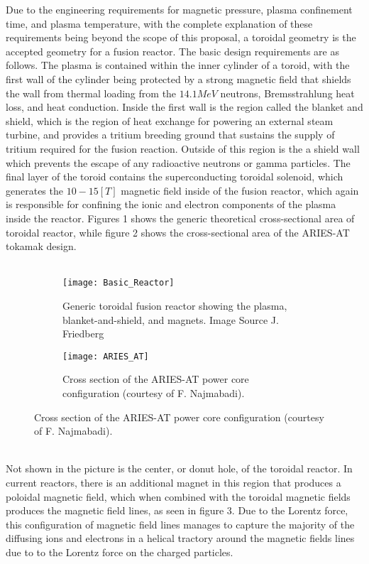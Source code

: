 \documentclass{article}
\begin{document}
Due to the engineering requirements for magnetic pressure, plasma confinement time, and plasma temperature, with the complete explanation of these requirements being beyond the scope of this proposal, a toroidal geometry is the accepted geometry for a fusion reactor. The basic design requirements are as follows. The plasma is contained within the inner cylinder of a toroid, with the first wall of the cylinder being protected by a strong magnetic field that shields the wall from thermal loading from the $14.1 MeV$ neutrons, Bremsstrahlung heat loss, and heat conduction. Inside the first wall is the region called the blanket and shield, which is the region of heat exchange for powering an external steam turbine, and provides a tritium breeding ground that sustains the supply of tritium required for the fusion reaction. Outside of this region is the a shield wall which prevents the escape of any radioactive neutrons or gamma particles. The final layer of the toroid contains the superconducting toroidal solenoid, which generates the $10-15 [T]$ magnetic field inside of the fusion reactor, which again is responsible for confining the ionic and electron components of the plasma inside the reactor. Figures 1 shows the generic theoretical cross-sectional area of toroidal reactor, while figure 2 shows the cross-sectional area of the ARIES-AT tokamak design.\\
\\
\begin{figure}[h]
\begin{subfigure}[t*]{0.5\textwidth}
\texttt{[image: Basic\_Reactor]}
\caption{Generic toroidal fusion reactor showing the plasma, blanket-and-shield, and magnets. Image Source J. Friedberg \cite{J_Friedberg:1} }
\end{subfigure}
\begin{subfigure}[t*]{0.5\textwidth}
\texttt{[image: ARIES\_AT]}
\caption{Cross section of the ARIES-AT power core conﬁguration (courtesy of F. Najmabadi). \cite{J_Friedberg:1} }
\end{subfigure}
\end{figure}
\\
Not shown in the picture is the center, or donut hole, of the toroidal reactor. In current reactors, there is an additional magnet in this region that produces a poloidal magnetic field, which when combined with the toroidal magnetic fields produces the magnetic field lines, as seen in figure 3. Due to the Lorentz force, this configuration of magnetic field lines manages to capture the majority of the diffusing ions and electrons in a helical tractory around the magnetic fields lines due to to the Lorentz force on the charged particles.
\end{document}
